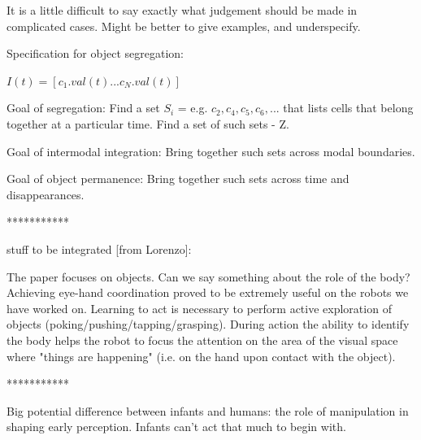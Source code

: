 It is a little difficult to say exactly what judgement should be
made in complicated cases.  Might be better to give examples,
and underspecify.

Specification for object segregation:

$I(t) = [c_1.val(t) ... c_N.val(t)]$

Goal of segregation:
  Find a set $S_i$ = e.g. ${ c_2,c_4,c_5,c_6,... }$ that lists cells that
  belong together at a particular time.
  Find a set of such sets - Z.

Goal of intermodal integration:
  Bring together such sets across modal boundaries.

Goal of object permanence:
  Bring together such sets across time and disappearances.


***********

stuff to be integrated [from Lorenzo]:


The paper focuses on objects. Can we say something about the role of the
body? Achieving eye-hand coordination proved to be extremely useful on the
robots we have worked on. Learning to act is necessary to perform active
exploration of objects (poking/pushing/tapping/grasping). During action the
ability to identify the body helps the robot to focus the attention on the
area of the visual space where "things are happening" (i.e. on the hand upon
contact with the object).


***********

Big potential difference between infants and humans: the role
of manipulation in shaping early perception.  Infants can't
act that much to begin with.



